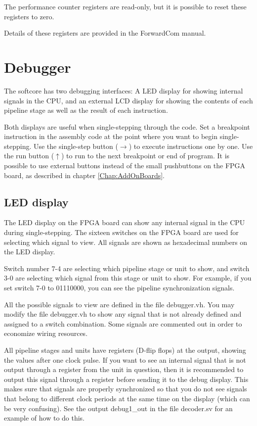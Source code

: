 \documentclass[11pt,a4paper,oneside,openright]{report}
\newcommand{\vv}{ \vspace{2mm} }   %
\begin{document}
The performance counter registers are read-only, but it is possible to reset these registers to zero. 
\vv

Details of these registers are provided in the ForwardCom manual. 
\vv


\chapter{Debugger} \label{Chap:Debugger}
The softcore has two debugging interfaces: A LED display for showing internal signals in the CPU, and an external LCD display for showing the contents of each pipeline stage as well as the result of each instruction.
\vv

Both displays are useful when single-stepping through the code. Set a breakpoint instruction in the assembly code at the point where you want to begin single-stepping. Use the single-step button ($\rightarrow$) to execute instructions one by one. Use the run button ($\uparrow$) to run to the next breakpoint or end of program. It is possible to use external buttons instead of the small pushbuttons on the FPGA board, as described in chapter \ref{Chap:AddOnBoards}. 
\vv

\section{LED display}
The LED display on the FPGA board can show any internal signal in the CPU during single-stepping. The sixteen switches on the FPGA board are used for selecting which signal to view. All signals are shown as hexadecimal numbers on the LED display.
\vv

Switch number 7-4 are selecting which pipeline stage or unit to show, and switch 3-0 are selecting which signal from this stage or unit to show. 
For example, if you set switch 7-0 to 01110000, you can see the pipeline synchronization signals.
\vv

All the possible signals to view are defined in the file debugger.vh. 
You may modify the file debugger.vh to show any signal that is not already defined and assigned to a switch combination. Some signals are commented out in order to economize wiring resources.
\vv

All pipeline stages and units have registers (D-flip flops) at the output, showing the values after one clock pulse. If you want to see an internal signal that is not output through a register from the unit in question, then it is recommended to output this signal through a register before sending it to the debug display. This makes sure that signals are properly synchronized so that you do not see signals that belong to different clock periods at the same time on the display (which can be very confusing). See the output debug1\_out in the file decoder.sv for an example of how to do this.
\vv
\end{document}
